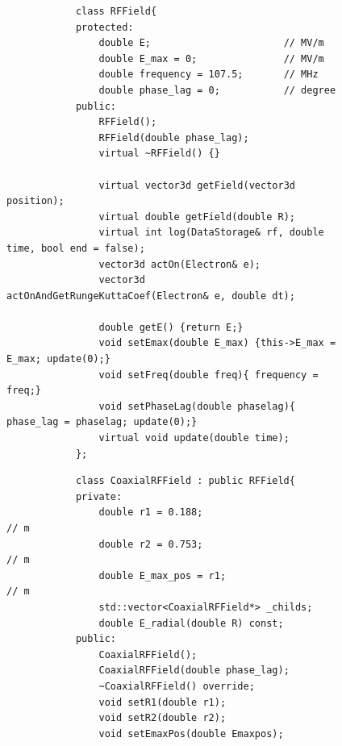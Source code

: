\documentclass[a4paper,oneside,12pt]{report}
\numberwithin{equation}{chapter}
\begin{document}
\begin{figure}[H]
    \begin{minipage}{\textwidth}
        \begin{verbatim}
            class RFField{
            protected:
                double E;                       // MV/m
                double E_max = 0;               // MV/m
                double frequency = 107.5;       // MHz
                double phase_lag = 0;           // degree
            public:
                RFField();
                RFField(double phase_lag);
                virtual ~RFField() {}

                virtual vector3d getField(vector3d position);              
                virtual double getField(double R);
                virtual int log(DataStorage& rf, double time, bool end = false);
                vector3d actOn(Electron& e);    
                vector3d actOnAndGetRungeKuttaCoef(Electron& e, double dt);                  
                
                double getE() {return E;}
                void setEmax(double E_max) {this->E_max = E_max; update(0);}
                void setFreq(double freq){ frequency = freq;}
                void setPhaseLag(double phaselag){ phase_lag = phaselag; update(0);}
                virtual void update(double time);
            };
        \end{verbatim}
    \end{minipage}
    \vspace{10pt}
    \begin{minipage}{\textwidth}
        \begin{verbatim}
            class CoaxialRFField : public RFField{
            private:
                double r1 = 0.188;                         // m
                double r2 = 0.753;                         // m
                double E_max_pos = r1;                     // m
                std::vector<CoaxialRFField*> _childs;
                double E_radial(double R) const;
            public:
                CoaxialRFField();
                CoaxialRFField(double phase_lag);
                ~CoaxialRFField() override;
                void setR1(double r1);
                void setR2(double r2);
                void setEmaxPos(double Emaxpos);   


\end{verbatim}
\end{minipage}
\end{figure}
\end{document}
